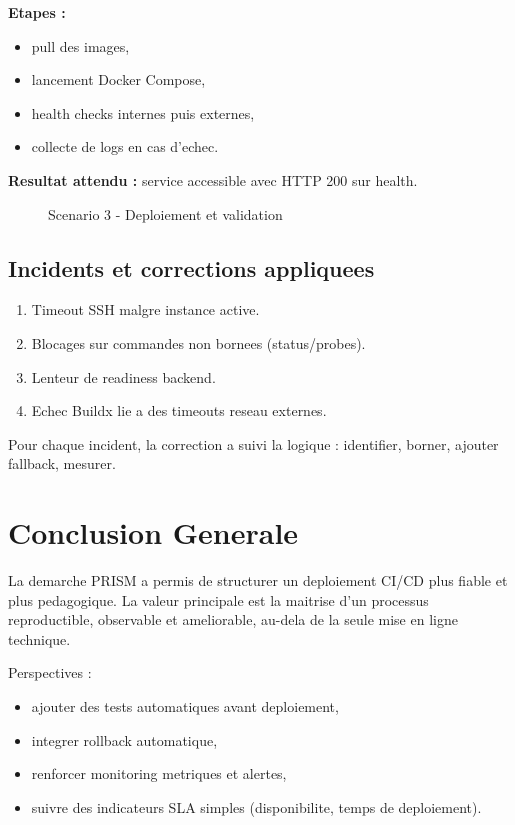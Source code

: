 \documentclass[12pt,a4paper]{report}
\begin{document}
\textbf{Etapes :}
\begin{itemize}
  \item pull des images,
  \item lancement Docker Compose,
  \item health checks internes puis externes,
  \item collecte de logs en cas d'echec.
\end{itemize}

\textbf{Resultat attendu :} service accessible avec HTTP 200 sur health.

\begin{figure}[H]
  \centering
  \caption{Scenario 3 - Deploiement et validation}
\end{figure}

\section{Incidents et corrections appliquees}
\begin{enumerate}
  \item Timeout SSH malgre instance active.
  \item Blocages sur commandes non bornees (status/probes).
  \item Lenteur de readiness backend.
  \item Echec Buildx lie a des timeouts reseau externes.
\end{enumerate}

Pour chaque incident, la correction a suivi la logique : identifier, borner, ajouter fallback, mesurer.

\chapter*{Conclusion Generale}
La demarche PRISM a permis de structurer un deploiement CI/CD plus fiable et plus pedagogique.
La valeur principale est la maitrise d'un processus reproductible, observable et ameliorable,
au-dela de la seule mise en ligne technique.

Perspectives :
\begin{itemize}
  \item ajouter des tests automatiques avant deploiement,
  \item integrer rollback automatique,
  \item renforcer monitoring metriques et alertes,
  \item suivre des indicateurs SLA simples (disponibilite, temps de deploiement).
\end{itemize}
\end{document}

